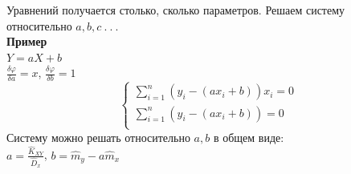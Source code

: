 \documentclass[russian, 12pt, fleqn,x11names]{article}
\begin{document}
Уравнений получается столько, сколько параметров. Решаем систему относительно $a, b, c\ .\ .\ . $\\
\textbf{Пример} \\
$Y=aX+b$\\
$\frac{\delta \varphi}{\delta a} = x$, $\frac{\delta \varphi}{\delta b} = 1$ \\
\begin{equation*} 
 \begin{cases}
   \displaystyle{\sum \limits_{i = 1}^{n}} (y_i -  (ax_i + b) )x_i = 0 \\
   \displaystyle{\sum \limits_{i = 1}^{n}} (y_i -  (ax_i + b) ) = 0 \\
 \end{cases}
\end{equation*}
Систему можно решать относительно $a, b$ в общем виде:\\
$a = \frac{\hat{K}_{XY}}{\hat{D}_x}$, $b = \hat{m}_y - a \hat{m}_x$\\
\end{document}
